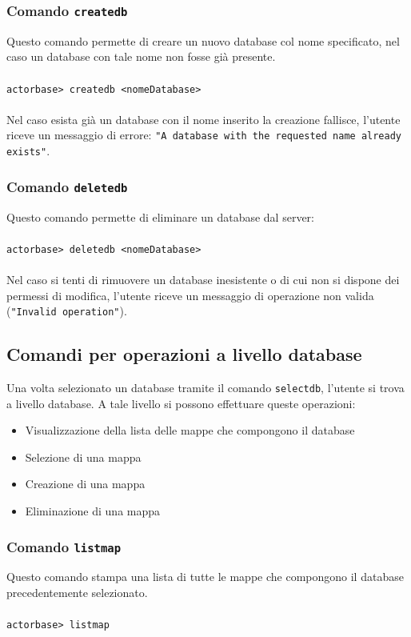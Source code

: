 \documentclass[a4paper]{article}
\begin{document}
	\subsubsection{Comando \texttt{createdb}}
	Questo comando permette di creare un nuovo database col nome specificato, nel caso  un database con tale nome non fosse già presente.
	\\ \\
	\texttt{actorbase>	createdb <nomeDatabase>}
	\\ \\
	Nel caso esista già un database con il nome inserito la creazione fallisce, l'utente riceve un messaggio di errore: \texttt{"A database with the requested name already exists"}.

	\subsubsection{Comando \texttt{deletedb}}
	Questo comando permette di eliminare un database dal server:
	\\ \\
	\texttt{actorbase>	deletedb <nomeDatabase>}
	\\ \\
	Nel caso si tenti di rimuovere un database inesistente o di cui non si dispone dei permessi di modifica, l'utente riceve un messaggio di operazione non valida (\texttt{"Invalid operation"}).
	

	\subsection{Comandi per operazioni a livello database}
	Una volta selezionato un database tramite il comando \texttt{selectdb}, l'utente si trova a livello database. A tale livello si possono effettuare queste operazioni:
	\begin{itemize}
		\item Visualizzazione della lista delle mappe che compongono il database
		\item Selezione di una mappa
		\item Creazione di una mappa
		\item Eliminazione di una mappa
	\end{itemize}

	\subsubsection{Comando \texttt{listmap}}
	Questo comando stampa una lista di tutte le mappe che compongono il database precedentemente selezionato.
	\\ \\
	\texttt{actorbase>	listmap}
\end{document}
